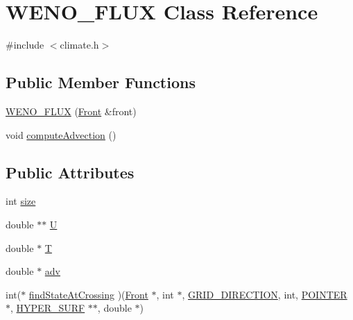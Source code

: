 \hypertarget{class_w_e_n_o___f_l_u_x}{}\section{W\+E\+N\+O\+\_\+\+F\+L\+UX Class Reference}
\label{class_w_e_n_o___f_l_u_x}


{\ttfamily \#include $<$climate.\+h$>$}

\subsection*{Public Member Functions}
\begin{DoxyCompactItemize}
\item 
\hyperlink{class_w_e_n_o___f_l_u_x_a93690224c41063c068b6e8763b05804e}{W\+E\+N\+O\+\_\+\+F\+L\+UX} (\hyperlink{fdecs_8h_ac32202b798f848095c489cfd04c4ca5f}{Front} \&front)
\item 
void \hyperlink{class_w_e_n_o___f_l_u_x_aac392dfff7d021c9e4d0d880441d291c}{compute\+Advection} ()
\end{DoxyCompactItemize}
\subsection*{Public Attributes}
\begin{DoxyCompactItemize}
\item 
int \hyperlink{class_w_e_n_o___f_l_u_x_a3f14a450e285ec0f4863aaabbbdb42a9}{size}
\item 
double $\ast$$\ast$ \hyperlink{class_w_e_n_o___f_l_u_x_acb0a4200fa2698cc6dcd2d2d31077d81}{U}
\item 
double $\ast$ \hyperlink{class_w_e_n_o___f_l_u_x_a56349578a681042c1dd6cdaadc94ae91}{T}
\item 
double $\ast$ \hyperlink{class_w_e_n_o___f_l_u_x_af7482c91f03b85fbcb7ca1d0afe314ad}{adv}
\item 
int($\ast$ \hyperlink{class_w_e_n_o___f_l_u_x_aa3fb08c26937c6bfbcbe44a36d9c6cc2}{find\+State\+At\+Crossing} )(\hyperlink{fdecs_8h_ac32202b798f848095c489cfd04c4ca5f}{Front} $\ast$, int $\ast$, \hyperlink{int_8h_aa7cc507beba6455174c0996f89fdc8c3}{G\+R\+I\+D\+\_\+\+D\+I\+R\+E\+C\+T\+I\+ON}, int, \hyperlink{cdecs_8h_ae51a81000f343b8ec43bca1f6a723d7b}{P\+O\+I\+N\+T\+ER} $\ast$, \hyperlink{int_8h_acef50fa4757ce0d3f75c97fab5a175bc}{H\+Y\+P\+E\+R\+\_\+\+S\+U\+RF} $\ast$$\ast$, double $\ast$)
\end{DoxyCompactItemize}


